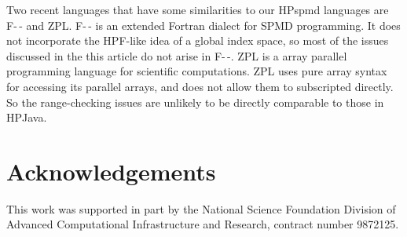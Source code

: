 \documentclass{article}
\begin{document}
Two recent languages that have some similarities to our HPspmd
languages are F-\,- and ZPL.  F-\,- \cite{FMM} is an extended Fortran
dialect for SPMD programming.  It does not incorporate the HPF-like
idea of a global index space, so most of the issues discussed in the
this article do not arise in F-\,-.  ZPL \cite{ZPL} is a array parallel
programming language for scientific computations.  ZPL uses pure array
syntax for accessing its parallel arrays, and does not allow them to
subscripted directly.  So the range-checking issues are unlikely to be
directly comparable to those in HPJava.

\section{Acknowledgements}

This work was supported in part by the National Science Foundation
Division of Advanced Computational Infrastructure and Research,
contract number 9872125.



\end{document}
